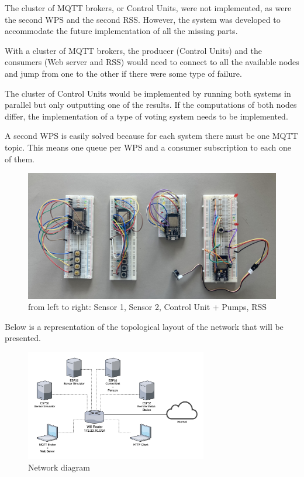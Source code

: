 \documentclass[11pt]{article}
\begin{document}
The cluster of MQTT brokers, or Control Units, were not implemented, as were the second WPS and the second RSS.
However, the system was developed to accommodate the future implementation of all the missing parts.

With a cluster of MQTT brokers, the producer (Control Units) and the consumers (Web server and RSS) would need to connect to all the available nodes and jump from one to the other if there were some type of failure.

The cluster of Control Units would be implemented by running both systems in parallel but only outputting one of the results. If the computations of both nodes differ, the implementation of a type of voting system needs to be implemented.

A second WPS is easily solved because for each system there must be one MQTT topic. This means one queue per WPS and a consumer subscription to each one of them.

\begin{figure}[H]
  \centering
  \includegraphics[width=\linewidth]{../diagrams/hardware.jpg}
  \caption{from left to right: Sensor 1, Sensor 2, Control Unit + Pumps, RSS}
  \label{fig:hardware}
\end{figure}

Below is a representation of the topological layout of the network that will be presented.

\begin{figure}[H]
  \centering
  \includegraphics[width=300px]{../diagrams/network-diagram.jpg}
  \caption{Network diagram}
  \label{fig:network-diagram}
\end{figure}
\end{document}
